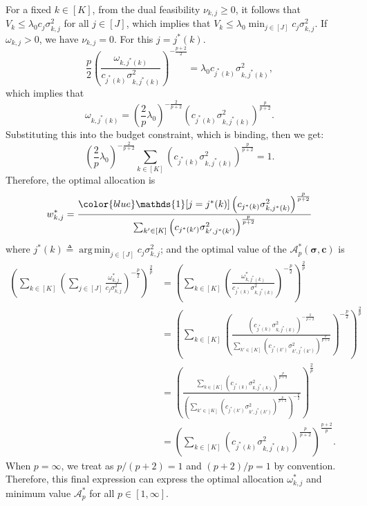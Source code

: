 \documentclass{article}
\def\vc{{\bm{c}}}
\def\gA{{\mathcal{A}}}
\DeclareMathOperator*{\argmin}{arg\,min}
\theoremstyle{plain}
\theoremstyle{definition}
\theoremstyle{plain}
\newcommand{\indicator}{\mathds{1}}
\begin{document}
For a fixed $k \in [K]$, from the dual feasibility $\nu_{k,j} \geq 0$, it follows that $V_k \leq \lambda_0 c_j \sigma_{k,j}^2$ for all $j\in[J]$, which implies that $V_k \leq \lambda_0 \min_{j\in[J]} c_j \sigma_{k,j}^2$.
If $\omega_{k,j} > 0 $, we have $\nu_{k,j}=0$.
For this $j = j^*(k)$.
\begin{equation}
    \frac{p}{2} \left( \frac{\omega_{k,j^*(k)}}{c_{j^*(k)}\sigma_{k,j^*(k)}^2} \right)^{-\frac{p+2}{2}}= \lambda_0 c_{j^*(k)} \sigma_{k,j^*(k)}^2,
\end{equation}
which implies that 
\begin{equation}
     \omega_{k,j^*(k)}= \left(\frac{2}{p} \lambda_0\right)^{-\frac{2}{p+2}} \left( c_{j^*(k)} \sigma_{k,j^*(k)}^2\right)^{\frac{p}{p+2}}.
\end{equation}
Substituting this into the budget constraint, which is binding, then we get:
\begin{equation}
     \left(\frac{2}{p} \lambda_0\right)^{-\frac{2}{p+2}} \sum_{k\in[K]} \left( c_{j^*(k)} \sigma_{k,j^*(k)}^2\right)^{\frac{p}{p+2}} = 1.
\end{equation}
Therefore, the optimal allocation is  
\begin{equation}
    w_{k, j}^* = \frac{{\color{blue}\indicator[j = j^*(k)]} \left( c_{j^*(k)} \sigma_{k, j^*(k)}^2\right)^{\frac{p}{p+2}}}{\sum_{k'\in[K]} \left(c_{j^*(k')} \sigma_{k',j^*(k')}^2 \right)^{\frac{p}{p+2}}}
\end{equation}
where $j^*(k) \triangleq \argmin_{j \in [J]} c_j \sigma_{k,j}^2$; and the optimal value of the $\gA_p^*(\bm\sigma, \vc)$ is 
\begin{align}
    \left(\sum_{k \in [K]} \left( \sum_{j\in[J]} \frac{\omega_{k,j}^*}{c_j \sigma_{k,j}^2} \right)^{-\frac{p}{2}}\right)^{\frac{2}{p}} & = \left(\sum_{k \in [K]} \left(  \frac{\omega_{k,j^*(k)}^*}{c_{j^*(k)} \sigma_{k,j^*(k)}^2} \right)^{-\frac{p}{2}}\right)^{\frac{2}{p}} \\
    & = \left(\sum_{k \in [K]} \left( \frac{\left( c_{j^*(k)} \sigma_{k, j^*(k)}^2\right)^{-\frac{2}{p+2}}}{\sum_{k'\in[K]} \left(c_{j^*(k')} \sigma_{k',j^*(k')}^2 \right)^{\frac{p}{p+2}}} \right)^{-\frac{p}{2}}\right)^{\frac{2}{p}}\\
    & = \left( \frac{\sum_{k \in [K]} \left( c_{j^*(k)} \sigma_{k, j^*(k)}^2\right)^{\frac{p}{p+2}}}{\left( \sum_{k'\in[K]} \left(c_{j^*(k')} \sigma_{k',j^*(k')}^2 \right)^{\frac{p}{p+2}} \right)^{-\frac{p}{2}}} \right)^{\frac{2}{p}}\\
    & = \left( \sum_{k \in [K]} \left( c_{j^*(k)} \sigma_{k, j^*(k)}^2\right)^{\frac{p}{p+2}} \right)^{\frac{p+2}{p}}.
\end{align}
When $p=\infty$, we treat as $p/(p+2) = 1$ and $(p+2)/p=1$ by convention.
Therefore, this final expression can express the optimal allocation $\omega_{k,j}^*$ and minimum value $\gA_p^*$ for all $p\in[1,\infty]$.
\end{document}
